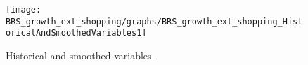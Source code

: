  
\begin{figure}[H]
\centering 
\texttt{[image: BRS\_growth\_ext\_shopping/graphs/BRS\_growth\_ext\_shopping\_HistoricalAndSmoothedVariables1]}
\caption{Historical and smoothed variables.}\label{Fig:HistoricalAndSmoothedVariables:1}
\end{figure}



